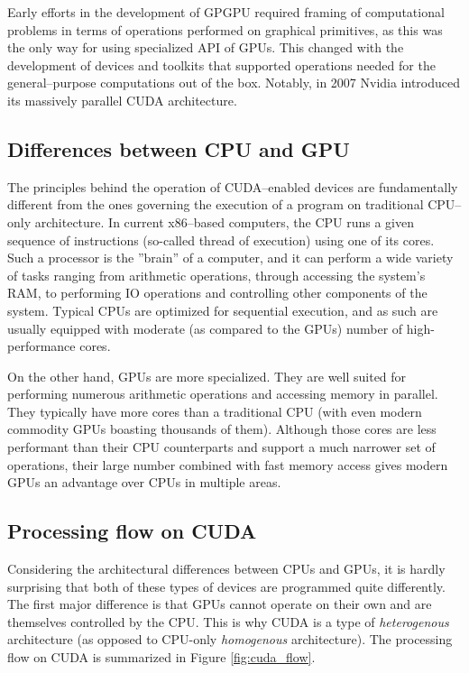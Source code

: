 Early efforts in the development of GPGPU required framing of computational problems in terms of
operations performed on graphical primitives, as this was the only way for using specialized API of
GPUs. This changed with the development of devices and toolkits that supported operations needed for
the general--purpose computations out of the box. Notably, in 2007 Nvidia introduced its massively
parallel CUDA architecture.

\subsection{Differences between CPU and GPU}
The principles behind the operation of CUDA--enabled devices are fundamentally different from the
ones governing the execution of a program on traditional CPU--only architecture. In current
x86--based computers, the CPU runs a given sequence of instructions (so-called thread of execution)
using one of its cores. Such a processor is the ''brain'' of a computer, and it can perform a wide
variety of tasks ranging from arithmetic operations, through accessing the system's RAM, to
performing IO operations and controlling other components of the system. Typical CPUs are optimized
for sequential execution, and as such are usually equipped with moderate (as compared to the GPUs)
number of high-performance cores.

On the other hand, GPUs are more specialized. They are well suited for performing numerous
arithmetic operations and accessing memory in parallel. They typically have more cores than a
traditional CPU (with even modern commodity GPUs boasting thousands of them). Although those cores
are less performant than their CPU counterparts and support a much narrower set of operations, their
large number combined with fast memory access gives modern GPUs an advantage over CPUs in multiple
areas.

\subsection{Processing flow on CUDA}
Considering the architectural differences between CPUs and GPUs, it is hardly surprising that both
of these types of devices are programmed quite differently. The first major difference is that GPUs
cannot operate on their own and are themselves controlled by the CPU. This is why CUDA is a type of
\emph{heterogenous} architecture (as opposed to CPU-only \emph{homogenous} architecture). The
processing flow on CUDA is summarized in Figure \ref{fig:cuda_flow}.

